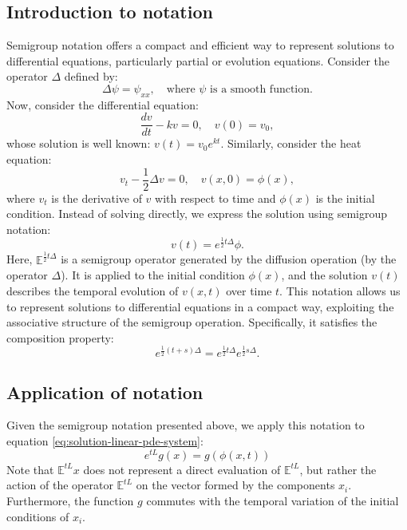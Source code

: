 \documentclass[12pt]{article}
\begin{document}
\subsection{Introduction to notation}
Semigroup notation offers a compact and efficient way to represent solutions to differential equations, particularly partial or evolution equations.
Consider the operator $\Delta$ defined by:
\begin{equation*}
    \Delta \psi = \psi_{xx}, \quad \text{where $\psi$ is a smooth function}.
\end{equation*}
Now, consider the differential equation:
\begin{equation*}
    
\frac{dv}{dt} - kv = 0, \quad v(0) = v_0,
\end{equation*}
whose solution is well known: $ v(t) = v_0 e^{kt} $.
Similarly, consider the heat equation:
\begin{equation*}
    v_t - \frac{1}{2} \Delta v = 0, \quad v(x, 0) = \phi(x),
\end{equation*}
where $v_t$ is the derivative of $v$ with respect to time and $\phi(x)$ is the initial condition. Instead of solving directly, we express the solution using semigroup notation:
\begin{equation*}
    
v(t) = e^{\frac{1}{2}t \Delta} \phi.
\end{equation*}
Here, $\mathbb{E}^{\frac{1}{2}t \Delta}$ is a semigroup operator generated by the diffusion operation (by the operator $\Delta$). It is applied to the initial condition $\phi(x)$, and the solution $v(t)$ describes the temporal evolution of $v(x,t)$ over time $t$. This notation allows us to represent solutions to differential equations in a compact way, exploiting the associative structure of the semigroup operation. Specifically, it satisfies the composition property:
\begin{equation*}
    e^{\frac{1}{2}(t+s)\Delta} = e^{\frac{1}{2}t \Delta} e^{\frac{1}{2}s \Delta}.
\end{equation*}
\subsection{Application of notation}
Given the semigroup notation presented above, we apply this notation to equation \eqref{eq:solution-linear-pde-system}:
\begin{equation}
e^{tL}g(x) = g(\phi(x,t))
\label{eq:solution-linear-pde-system-semigroup}
\end{equation}
Note that $\mathbb{E}^{tL}x$ does not represent a direct evaluation of $\mathbb{E}^{tL}$, but rather the action of the operator $\mathbb{E}^{tL}$ on the vector formed by the components $x_i$. Furthermore, the function $g$ commutes with the temporal variation of the initial conditions of $x_i$.
 
\end{document}
